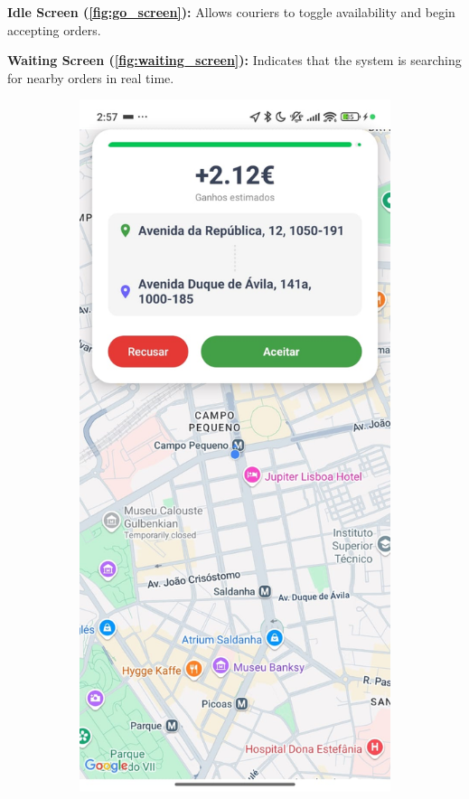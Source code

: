 \noindent\textbf{Idle Screen (\ref{fig:go_screen}):}  
Allows couriers to toggle availability and begin accepting orders.

\noindent\textbf{Waiting Screen (\ref{fig:waiting_screen}):}  
Indicates that the system is searching for nearby orders in real time.



\begin{figure}[H]
    \centering
    \begin{subfigure}[b]{0.48\textwidth}
        \centering
        \includegraphics[width=\textwidth]{images/delivery_request.jpeg}

\end{subfigure}
\end{figure}
